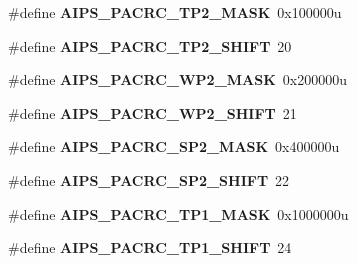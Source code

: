 \begin{DoxyCompactItemize}
\item 
\hypertarget{group___a_i_p_s___register___masks_ga65b51d658b2c8abdb3037dbb55de132f}{}\#define {\bfseries A\+I\+P\+S\+\_\+\+P\+A\+C\+R\+C\+\_\+\+T\+P2\+\_\+\+M\+A\+S\+K}~0x100000u\label{group___a_i_p_s___register___masks_ga65b51d658b2c8abdb3037dbb55de132f}

\item 
\hypertarget{group___a_i_p_s___register___masks_ga5c2aec58b5a4cecd1d76d1a55801860f}{}\#define {\bfseries A\+I\+P\+S\+\_\+\+P\+A\+C\+R\+C\+\_\+\+T\+P2\+\_\+\+S\+H\+I\+F\+T}~20\label{group___a_i_p_s___register___masks_ga5c2aec58b5a4cecd1d76d1a55801860f}

\item 
\hypertarget{group___a_i_p_s___register___masks_ga89265c4517a1b3edad3dd51d68965a56}{}\#define {\bfseries A\+I\+P\+S\+\_\+\+P\+A\+C\+R\+C\+\_\+\+W\+P2\+\_\+\+M\+A\+S\+K}~0x200000u\label{group___a_i_p_s___register___masks_ga89265c4517a1b3edad3dd51d68965a56}

\item 
\hypertarget{group___a_i_p_s___register___masks_ga9642e0ef37faa352c0e6383ae1184dd5}{}\#define {\bfseries A\+I\+P\+S\+\_\+\+P\+A\+C\+R\+C\+\_\+\+W\+P2\+\_\+\+S\+H\+I\+F\+T}~21\label{group___a_i_p_s___register___masks_ga9642e0ef37faa352c0e6383ae1184dd5}

\item 
\hypertarget{group___a_i_p_s___register___masks_ga6bac5e2ed8cdc194471ffdd39e202b10}{}\#define {\bfseries A\+I\+P\+S\+\_\+\+P\+A\+C\+R\+C\+\_\+\+S\+P2\+\_\+\+M\+A\+S\+K}~0x400000u\label{group___a_i_p_s___register___masks_ga6bac5e2ed8cdc194471ffdd39e202b10}

\item 
\hypertarget{group___a_i_p_s___register___masks_gabb851888de7464c3cf7604aac54c9016}{}\#define {\bfseries A\+I\+P\+S\+\_\+\+P\+A\+C\+R\+C\+\_\+\+S\+P2\+\_\+\+S\+H\+I\+F\+T}~22\label{group___a_i_p_s___register___masks_gabb851888de7464c3cf7604aac54c9016}

\item 
\hypertarget{group___a_i_p_s___register___masks_ga0a1bf27c4f4edcd9c35c77d48c881cbd}{}\#define {\bfseries A\+I\+P\+S\+\_\+\+P\+A\+C\+R\+C\+\_\+\+T\+P1\+\_\+\+M\+A\+S\+K}~0x1000000u\label{group___a_i_p_s___register___masks_ga0a1bf27c4f4edcd9c35c77d48c881cbd}

\item 
\hypertarget{group___a_i_p_s___register___masks_gaf269ee59444a7009b58137f3049be346}{}\#define {\bfseries A\+I\+P\+S\+\_\+\+P\+A\+C\+R\+C\+\_\+\+T\+P1\+\_\+\+S\+H\+I\+F\+T}~24\label{group___a_i_p_s___register___masks_gaf269ee59444a7009b58137f3049be346}


\end{DoxyCompactItemize}

